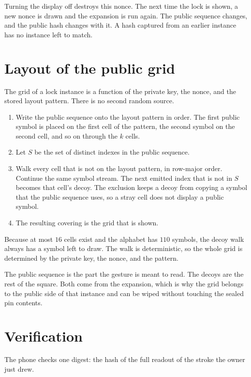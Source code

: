 \documentclass[11pt]{article}
\begin{document}
Turning the display off destroys this nonce.
The next time the lock is shown, a new nonce is drawn and the expansion is run again.
The public sequence changes, and the public hash changes with it.
A hash captured from an earlier instance has no instance left to match.

\section{Layout of the public grid}
\label{sec:layout}

The grid of a lock instance is a function of the private key, the nonce, and the stored layout pattern.
There is no second random source.

\begin{enumerate}
  \item Write the public sequence onto the layout pattern in order.
        The first public symbol is placed on the first cell of the pattern, the second symbol on the second cell, and so on through the \(k\) cells.
  \item Let \(S\) be the set of distinct indexes in the public sequence.
  \item Walk every cell that is not on the layout pattern, in row-major order.
        Continue the same symbol stream.
        The next emitted index that is not in \(S\) becomes that cell's decoy.
        The exclusion keeps a decoy from copying a symbol that the public sequence uses, so a stray cell does not display a public symbol.
  \item The resulting covering is the grid that is shown.
\end{enumerate}

Because at most \(16\) cells exist and the alphabet has \(110\) symbols, the decoy walk always has a symbol left to draw.
The walk is deterministic, so the whole grid is determined by the private key, the nonce, and the pattern.

The public sequence is the part the gesture is meant to read.
The decoys are the rest of the square.
Both come from the expansion, which is why the grid belongs to the public side of that instance and can be wiped without touching the sealed pin contents.

\section{Verification}
\label{sec:verify}

The phone checks one digest: the hash of the full readout of the stroke the owner just drew.
\end{document}
